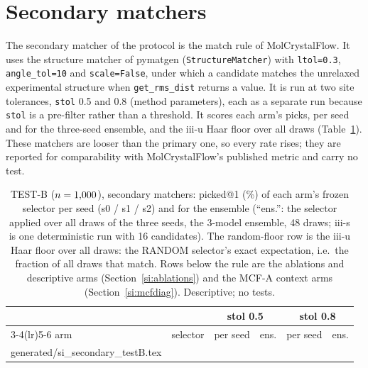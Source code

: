 \documentclass[journal=acsodf,manuscript=article]{achemso}
\makeatletter
\newcommand{\inputrows}[1]{\@@input #1 }
\makeatother
\begin{document}
\clearpage
\section{Secondary matchers}\label{si:secondary}
The secondary matcher of the protocol is the match rule of
MolCrystalFlow\cite{zeng2026molcrystalflow}. It uses the structure matcher of
pymatgen\cite{ong2013pymatgen} (\texttt{StructureMatcher}) with \texttt{ltol=0.3},
\texttt{angle\_tol=10} and \texttt{scale=False}, under which a
candidate matches the unrelaxed experimental structure when \texttt{get\_rms\_dist} returns a
value. It is run at two site tolerances, \texttt{stol} 0.5 and 0.8 (method parameters), each
as a separate run because \texttt{stol} is a pre-filter rather than a threshold. It scores each
arm's picks, per seed and for the three-seed ensemble, and the iii-u Haar floor over all draws
(Table~\ref{tab:si_secondary}). These matchers are looser than the primary one, so every rate
rises; they are reported for comparability with MolCrystalFlow's published metric and carry no
test.

\begin{table}[htbp]
\caption{TEST-B ($n=1{,}000$), secondary matchers: picked@1 (\%) of each arm's frozen selector per
seed (s0 / s1 / s2) and for the ensemble (``ens.'': the selector applied over all draws of the
three seeds, the 3-model ensemble, 48 draws; iii-s is one deterministic run with 16 candidates).
The random-floor row is the iii-u Haar floor over all draws: the RANDOM selector's exact
expectation, i.e.\ the fraction of all draws that match. Rows below the rule are the ablations
and descriptive arms (Section~\ref{si:ablations}) and the MCF-A context arms
(Section~\ref{si:mcfdiag}). Descriptive; no tests.}
\label{tab:si_secondary}
\centering
\footnotesize
\setlength{\tabcolsep}{3pt}
\begin{tabular}{@{}llcccc@{}}
\toprule
 & & \multicolumn{2}{c}{stol 0.5} & \multicolumn{2}{c}{stol 0.8} \\
\cmidrule(lr){3-4}\cmidrule(lr){5-6}
arm & selector & per seed & ens. & per seed & ens. \\
\midrule
\inputrows{generated/si_secondary_testB.tex}
\bottomrule
\end{tabular}
\end{table}
\end{document}
